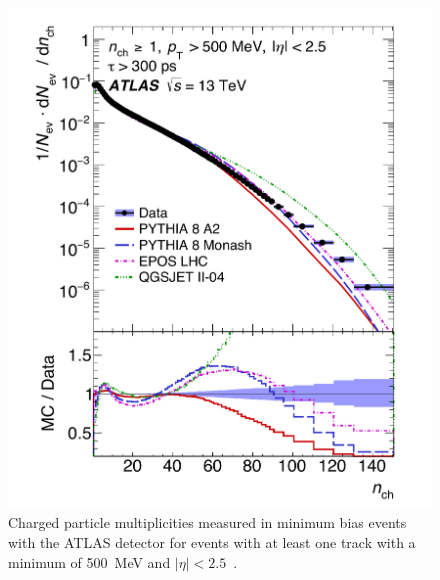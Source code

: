 \begin{figure}[tbp]
  \centering
  \includegraphics[width=.7\textwidth]{figures/DS_chargedParticleMultiplicities_pileup.pdf}
  \caption{Charged particle multiplicities measured in minimum bias events with the ATLAS detector for events with at least one track with a minimum \pt of 500~MeV and $|\eta|< 2.5$~\cite{Aad:2016mok}.}
  \label{fig:PILEUPchargedParticleMultiplicities}
\end{figure}

